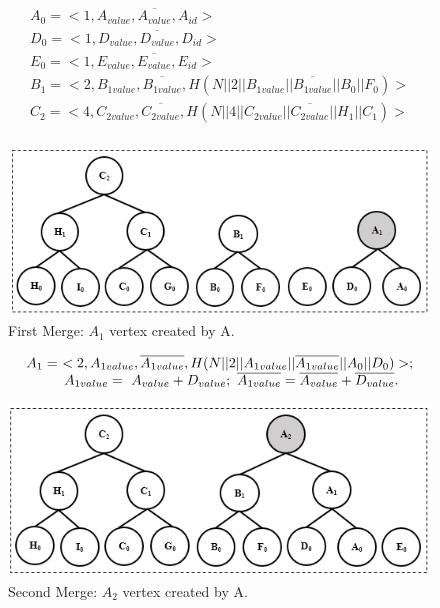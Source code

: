 		\begin{equation*}
			\begin{array}{l}
				A_{0} = <1, A_{value}, \overline{A_{value}}, A_{id}>\\
				D_{0} = <1, D_{value}, \overline{D_{value}}, D_{id}>\\
				E_{0} = <1, E_{value}, \overline{E_{value}}, E_{id}>\\
				B_{1} = <2, B_{1value}, \overline{B_{1value}}, H(N || 2 || B_{1value} || \overline{B_{1value}} || B_{0} || F_{0})>\\
				C_{2} = <4, C_{2value}, \overline{C_{2value}}, H(N || 4 || C_{2value} || \overline{C_{2value}} || H_{1} || C_{1})>\\
			\end{array}
		\end{equation*}
		\begin{figure}[h!]
			\centering
			\includegraphics{images/commitment-tree-example-2-shia.png}
			\caption{First Merge: $A_{1}$ vertex created by A.}
			\label{fig:commitment-tree-example-2-shia}
		\end{figure}
		\begin{equation*}
			\begin{array}{l}
				A_{1} =\  < 2, A_{1value}, \overline{A_{1value}}, H(N || 2 || A_{1value}|| \overline{A_{1value}} || A_{0} || D_{0})>;\\
				\textcolor{white}{XXX} A_{1value} =\  A_{value} + D_{value};\ \overline{A_{1value}} = \overline{A_{value}} + \overline{D_{value}}.
			\end{array}
		\end{equation*}
		\begin{figure}[h!]
			\centering
			\includegraphics{images/commitment-tree-example-3-shia.png}
			\caption{Second Merge: $A_{2}$ vertex created by A.}
			\label{fig:commitment-tree-example-3-shia}
		\end{figure}

